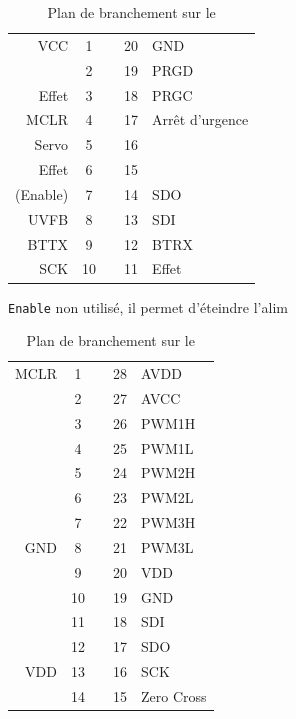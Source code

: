 		\begin{table}[hb]
			\begin{multicols}{2}
			\begin{center}
			
			
			\begin{footnotesize}
			\begin{tabular}{r|ccc|l}
				VCC		& 1 &   & 20 & GND \\ 
				  		& 2 &   & 19 & PRGD \\ 
				Effet	& 3 &   & 18 & PRGC \\ 
				MCLR 	& 4 &   & 17 & Arrêt d'urgence \\ 
				Servo 	& 5 &   & 16 &   \\
				 Effet	& 6 &   & 15 &   \\ 
				(Enable)	& 7 &   & 14 & SDO \\ 
				UVFB 	& 8 &   & 13 & SDI \\ 
				BTTX 	& 9 &   & 12 & BTRX \\ 
				SCK 	& 10&   & 11 & Effet   \\ 
				\end{tabular} 
				\texttt{Enable} non utilisé, il permet d'éteindre l'alim
			\end{footnotesize}
				
			
			\caption{Plan de branchement sur le \pic}
			\label{pinoutpic}
		
			
			\begin{footnotesize}
				\begin{tabular}{r|ccc|l}
				MCLR 	& 1 &    & 28 & AVDD 	\\ 
				  		& 2 &    & 27 & AVCC 	\\ 
				  		& 3 &    & 26 & PWM1H	\\
				  		& 4 &    & 25 & PWM1L	\\ 
				  		& 5 &    & 24 & PWM2H	\\ 
				  		& 6 &    & 23 & PWM2L  	\\ 
				 		& 7 &    & 22 & PWM3H  	\\ 
				GND 	& 8 &    & 21 & PWM3L  	\\ 
				  		& 9 &    & 20 & VDD 	\\ 
				  		& 10 &   & 19 & GND 	\\ 
				  		& 11 &   & 18 & SDI 	\\ 
				  		& 12 &   & 17 & SDO 	\\ 
				VDD 	& 13 &   & 16 & SCK 	\\ 
				  		& 14 &   & 15 & Zero Cross\\ 
				\end{tabular} 
			\end{footnotesize}
			\caption{Plan de branchement sur le \dspic}
			\label{pinoutdspic}
			\end{center}
			\end{multicols}
		\end{table}

